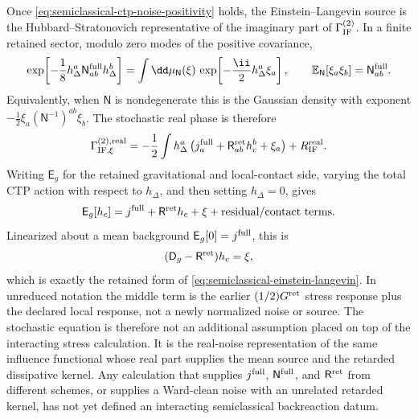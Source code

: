 \begin{controlledapproximation}
Once \eqref{eq:semiclassical-ctp-noise-positivity} holds, the
Einstein--Langevin source is the Hubbard--Stratonovich representative of the
imaginary part of \(\Gamma_{\rm IF}^{(2)}\).  In a finite retained sector,
modulo zero modes of the positive covariance,
\begin{equation}
  \exp\!\left[
    -\frac18 h_\Delta^a\mathsf N^{\rm full}_{ab}h_\Delta^b
  \right]
  =
  \int\dd\mu_{\mathsf N}(\xi)\,
  \exp\!\left[
    -\frac{\ii}{2}h_\Delta^a\xi_a
  \right],
  \qquad
  \mathbb E_{\mathsf N}[\xi_a\xi_b]=\mathsf N^{\rm full}_{ab}.
  \label{eq:semiclassical-ctp-hubbard-stratonovich}
\end{equation}
Equivalently, when \(\mathsf N\) is nondegenerate this is the Gaussian density
with exponent
\(-\frac12\xi_a(\mathsf N^{-1})^{ab}\xi_b\).  The stochastic real phase is
therefore
\begin{equation}
  \Gamma_{\rm IF,\xi}^{(2),{\rm real}}
  =
  -\frac12\int h_\Delta^a
  \left(
    j_a^{\rm full}
    +
    \mathsf R^{\rm ret}_{ab}h_c^b
    +
    \xi_a
  \right)
  +R_{\rm IF}^{\rm real}.
  \label{eq:semiclassical-ctp-stochastic-real-phase}
\end{equation}
Writing \(\mathsf E_g\) for the retained gravitational and local-contact side,
varying the total CTP action with respect to \(h_\Delta\), and then setting
\(h_\Delta=0\), gives
\[
  \mathsf E_g[h_c]
  =
  j^{\rm full}
  +
  \mathsf R^{\rm ret}h_c
  +
  \xi
  +
  \text{residual/contact terms}.
\]
Linearized about a mean background
\(\mathsf E_g[0]=j^{\rm full}\), this is
\[
  (\mathsf D_g-\mathsf R^{\rm ret})h_c=\xi ,
\]
which is exactly the retained form of
\eqref{eq:semiclassical-einstein-langevin}.  In unreduced notation the middle
term is the earlier
\((1/2)G^{\rm ret}\) stress response plus the declared local response, not a
newly normalized noise or source.  The stochastic equation is therefore not an
additional assumption placed on top of the interacting stress calculation.  It is
the real-noise representation of the same influence functional whose real part
supplies the mean source and the retarded dissipative kernel.  Any calculation
that supplies \(j^{\rm full}\), \(\mathsf N^{\rm full}\), and
\(\mathsf R^{\rm ret}\) from different schemes, or supplies a Ward-clean noise
with an unrelated retarded kernel, has not yet defined an interacting
semiclassical backreaction datum.
\end{controlledapproximation}

